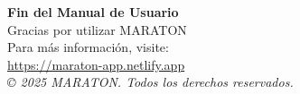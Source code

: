 \documentclass[11pt,a4paper,twoside]{book}
\begin{document}
\printindex

\cleardoublepage
\thispagestyle{empty}
\vspace*{\fill}
\begin{center}
\Large
\textbf{Fin del Manual de Usuario}\\[1cm]
\normalsize
Gracias por utilizar MARATON\\[0.5cm]
Para más información, visite:\\
\url{https://maraton-app.netlify.app}\\[1cm]
\textit{© 2025 MARATON. Todos los derechos reservados.}
\end{center}
\vspace*{\fill}
\end{document}
